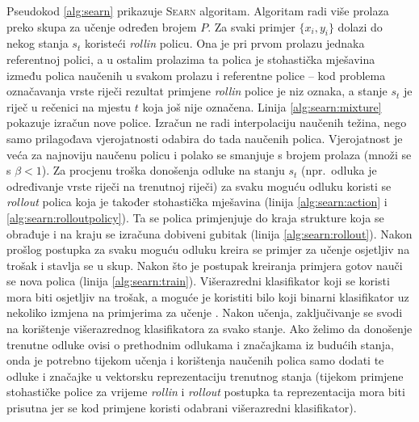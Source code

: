 Pseudokod \ref{alg:searn} prikazuje \textsc{Searn} algoritam. Algoritam radi
više prolaza preko skupa za učenje određen brojem $P$. Za svaki primjer $\{x_i,
y_i\}$ dolazi do nekog stanja $s_t$ koristeći \textit{rollin} policu. Ona je pri
prvom prolazu jednaka referentnoj polici, a u ostalim prolazima ta polica je
stohastička mješavina između polica naučenih u svakom prolazu i referentne
police -- kod problema označavanja vrste riječi rezultat primjene
\textit{rollin} police je niz oznaka, a stanje $s_t$ je riječ u rečenici na
mjestu $t$ koja još nije označena. Linija \ref{alg:searn:mixture} pokazuje
izračun nove police. Izračun ne radi interpolaciju naučenih težina, nego samo
prilagođava vjerojatnosti odabira do tada naučenih polica. Vjerojatnost je veća
za najnoviju naučenu policu i polako se smanjuje s brojem prolaza (množi se s
$\beta < 1$). Za procjenu troška donošenja odluke na stanju $s_t$ (npr.~odluka
je određivanje vrste riječi na trenutnoj riječi) za svaku moguću odluku koristi
se \textit{rollout} polica koja je također stohastička mješavina (linija
\ref{alg:searn:action} i \ref{alg:searn:rolloutpolicy}). Ta se polica primjenjuje
do kraja strukture koja se obrađuje i na kraju se izračuna dobiveni gubitak
(linija \ref{alg:searn:rollout}). Nakon prošlog postupka za svaku moguću odluku
kreira se primjer za učenje osjetljiv na trošak i stavlja se u skup. Nakon što
je postupak kreiranja primjera gotov nauči se nova polica (linija
\ref{alg:searn:train}). Višerazredni klasifikator koji se koristi mora biti
osjetljiv na trošak, a moguće je koristiti bilo koji binarni klasifikator uz
nekoliko izmjena na primjerima za učenje \citep{zadrozny2003cost,
beygelzimer2005weighted, beygelzimer2005error}. Nakon učenja, zaključivanje se
svodi na korištenje višerazrednog klasifikatora za svako stanje. Ako želimo da
donošenje trenutne odluke ovisi o prethodnim odlukama i značajkama iz budućih
stanja, onda je potrebno tijekom učenja i korištenja naučenih polica samo dodati
te odluke i značajke u vektorsku reprezentaciju trenutnog stanja (tijekom
primjene stohastičke police za vrijeme \textit{rollin} i \textit{rollout}
postupka ta reprezentacija mora biti prisutna jer se kod primjene koristi
odabrani višerazredni klasifikator).

